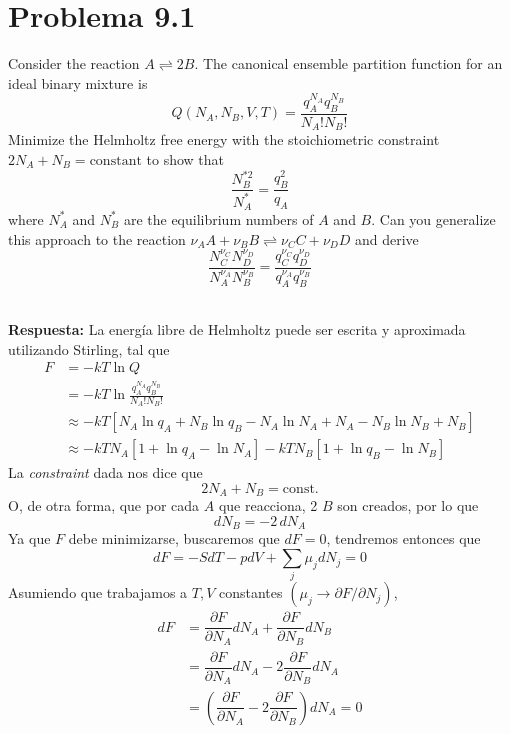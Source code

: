 \documentclass[]{article}
\numberwithin{equation}{section}
\newcommand{\0}{\textcolor{gray}{0}}
\newcommand{\pd}[2]{\dfrac{\partial #1}{\partial #2}}
\newcommand{\lpd}[2]{\partial #1/\partial #2}
\newcommand{\resp}{
	\\
	
	\textbf{Respuesta:} }
\begin{document}
\section{Problema 9.1}
Consider the reaction $A \rightleftharpoons 2B$. The canonical ensemble partition function for an ideal binary mixture is
\begin{equation}
	Q(N_A,N_B,V,T) = \frac{q_A^{N_A} q_B^{N_B}}{N_A! N_B!}
\end{equation}
Minimize the Helmholtz free energy with the stoichiometric constraint $2N_A + N_B = \mathrm{constant}$ to show that
\begin{equation}
	\frac{N_B^{*2}}{N_A^{*}} = \frac{q_B^2}{q_A}
\end{equation}
where $N_A^{*}$ and $N_B^{*}$ are the equilibrium numbers of $A$ and $B$. Can you generalize this approach to the reaction $\nu_A A + \nu_B B \rightleftharpoons \nu_C C + \nu_D D$ and derive
\begin{equation}
	\frac{N_C^{\nu_C} N_D^{\nu_D}}{N_A^{\nu_A} N_B^{\nu_B}} = \frac{q_C^{\nu_C} q_D^{\nu_D}}{q_A^{\nu_A} q_B^{\nu_B}}
\end{equation}
\resp La energía libre de Helmholtz puede ser escrita y aproximada utilizando Stirling, tal que
\begin{align}
	F &= -kT\ln Q \nonumber\\
	&= -kT\ln \frac{q_A^{N_A} q_B^{N_B}}{N_A! N_B!} \nonumber\\
	&\approx -kT\left[N_A\ln q_A + N_B\ln q_B - N_A\ln N_A + N_A - N_B\ln N_B + N_B\right] \nonumber\\
	&\approx -kT N_A \left[1 + \ln q_A - \ln N_A\right] - kT N_B \left[1 + \ln q_B - \ln N_B\right]
\end{align}
La \textit{constraint} dada nos dice que
\begin{equation}
	2N_A + N_B = \mathrm{const.}
\end{equation}
O, de otra forma, que por cada $A$ que reacciona, 2 $B$ son creados, por lo que
\begin{equation}
	dN_B = -2 \, dN_A
\end{equation}
Ya que $F$ debe minimizarse, buscaremos que $dF = 0$, tendremos entonces que
\begin{equation*}
	dF = -SdT - pdV + \sum_{j} \mu_j dN_j = 0
\end{equation*}
Asumiendo que trabajamos a $T,V$ constantes $\left(\mu_j \rightarrow \lpd{F}{N_j}\right)$,
\begin{align*}
	dF &= \pd{F}{N_A}dN_A + \pd{F}{N_B}dN_B\\
	&= \pd{F}{N_A}dN_A - 2 \pd{F}{N_B}dN_A\\
	&= \left(\pd{F}{N_A} - 2 \pd{F}{N_B}\right) dN_A = 0
\end{align*}
\end{document}
